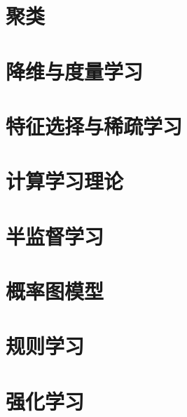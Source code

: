 \documentclass{ctexart}
\begin{document}
			\section{聚类}
			\section{降维与度量学习}
			\section{特征选择与稀疏学习}
			\section{计算学习理论}
			\section{半监督学习}
			\section{概率图模型}
			\section{规则学习}
			\section{强化学习}
			
\end{document}
